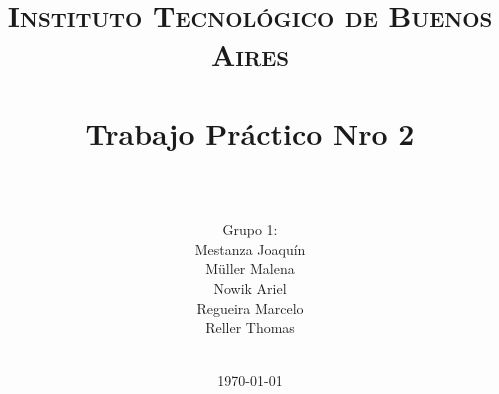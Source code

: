 









\title{
	\normalfont \normalsize \textsc{Instituto Tecnológico de Buenos Aires} \\ [25pt]
	\horrule{2pt} \\[0.4cm]
	\huge Trabajo Pr\'actico Nro 2\\
	\horrule{2pt} \\[0cm]
\author{Grupo 1:\\Mestanza Joaqu\'in\\ Müller Malena\\Nowik Ariel\\ Regueira Marcelo \\Reller Thomas\\ \\ }
}
\date{\today} %

\maketitle
\newpage


%
%
%
%
%
%
%


